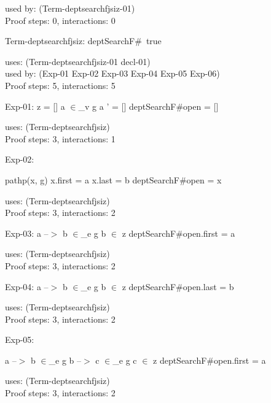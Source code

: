 \documentclass[a4paper]{article}
\begin{document}
used by: (Term-deptsearchfjsiz-01)\\
Proof steps: 0, interactions: 0

\medskip

Term-deptsearchfjsiz: 
 \Fol \Do deptSearchF\#\Dc\ true


uses: (Term-deptsearchfjsiz-01 decl-01)\\
used by: (Exp-01 Exp-02 Exp-03 Exp-04 Exp-05 Exp-06)\\
Proof steps: 5, interactions: 5

\medskip

Exp-01: 
 \Fol z = [] \And a $\in$\_v g \Or a ' = [] \Imp \Do deptSearchF\#\Dc open = []


uses: (Term-deptsearchfjsiz)\\
Proof steps: 3, interactions: 1

\medskip

Exp-02: 
\begin{flushleft}


\Fol

pathp(x, g) \And x.first = a \And x.last = b \Imp \Do deptSearchF\#\Dc open = x

\end{flushleft}


uses: (Term-deptsearchfjsiz)\\
Proof steps: 3, interactions: 2

\medskip

Exp-03: 
 \Fol a --$>$ b $\in$\_e g \And b $\in$ z \Imp \Do deptSearchF\#\Dc open.first = a


uses: (Term-deptsearchfjsiz)\\
Proof steps: 3, interactions: 2

\medskip

Exp-04: 
 \Fol a --$>$ b $\in$\_e g \And b $\in$ z \Imp \Do deptSearchF\#\Dc open.last = b


uses: (Term-deptsearchfjsiz)\\
Proof steps: 3, interactions: 2

\medskip

Exp-05: 
\begin{flushleft}


\Fol

a --$>$ b $\in$\_e g \And b --$>$ c $\in$\_e g \And c $\in$ z \Imp \Do deptSearchF\#\Dc open.first = a

\end{flushleft}


uses: (Term-deptsearchfjsiz)\\
Proof steps: 3, interactions: 2
\end{document}
